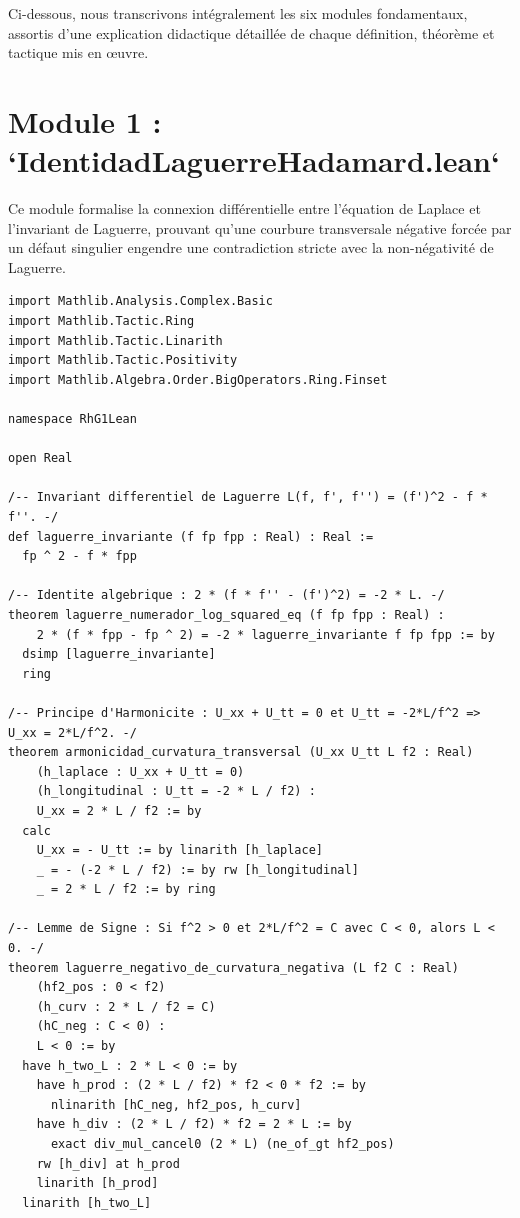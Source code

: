 \documentclass[11pt,a4paper]{article}
\theoremstyle{definition}
\theoremstyle{remark}
\begin{document}
Ci-dessous, nous transcrivons intégralement les six modules fondamentaux, assortis d'une explication didactique détaillée de chaque définition, théorème et tactique mis en œuvre.

\section{Module 1 : `IdentidadLaguerreHadamard.lean`}

Ce module formalise la connexion différentielle entre l'équation de Laplace et l'invariant de Laguerre, prouvant qu'une courbure transversale négative forcée par un défaut singulier engendre une contradiction stricte avec la non-négativité de Laguerre.

\begin{lstlisting}[language=Lean4]
import Mathlib.Analysis.Complex.Basic
import Mathlib.Tactic.Ring
import Mathlib.Tactic.Linarith
import Mathlib.Tactic.Positivity
import Mathlib.Algebra.Order.BigOperators.Ring.Finset

namespace RhG1Lean

open Real

/-- Invariant differentiel de Laguerre L(f, f', f'') = (f')^2 - f * f''. -/
def laguerre_invariante (f fp fpp : Real) : Real :=
  fp ^ 2 - f * fpp

/-- Identite algebrique : 2 * (f * f'' - (f')^2) = -2 * L. -/
theorem laguerre_numerador_log_squared_eq (f fp fpp : Real) :
    2 * (f * fpp - fp ^ 2) = -2 * laguerre_invariante f fp fpp := by
  dsimp [laguerre_invariante]
  ring

/-- Principe d'Harmonicite : U_xx + U_tt = 0 et U_tt = -2*L/f^2 => U_xx = 2*L/f^2. -/
theorem armonicidad_curvatura_transversal (U_xx U_tt L f2 : Real)
    (h_laplace : U_xx + U_tt = 0)
    (h_longitudinal : U_tt = -2 * L / f2) :
    U_xx = 2 * L / f2 := by
  calc
    U_xx = - U_tt := by linarith [h_laplace]
    _ = - (-2 * L / f2) := by rw [h_longitudinal]
    _ = 2 * L / f2 := by ring

/-- Lemme de Signe : Si f^2 > 0 et 2*L/f^2 = C avec C < 0, alors L < 0. -/
theorem laguerre_negativo_de_curvatura_negativa (L f2 C : Real)
    (hf2_pos : 0 < f2)
    (h_curv : 2 * L / f2 = C)
    (hC_neg : C < 0) :
    L < 0 := by
  have h_two_L : 2 * L < 0 := by
    have h_prod : (2 * L / f2) * f2 < 0 * f2 := by
      nlinarith [hC_neg, hf2_pos, h_curv]
    have h_div : (2 * L / f2) * f2 = 2 * L := by
      exact div_mul_cancel0 (2 * L) (ne_of_gt hf2_pos)
    rw [h_div] at h_prod
    linarith [h_prod]
  linarith [h_two_L]


\end{lstlisting}
\end{document}
